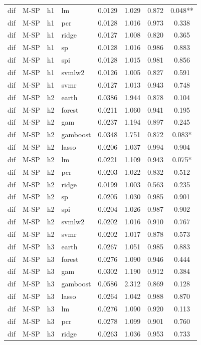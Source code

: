 \begin{ThreePartTable}
\begin{longtable}[t]{llclcccc}
dif & M-SP & h1 & lm & 0.0129 & 1.029 & 0.872 & 0.048**\\
dif & M-SP & h1 & pcr & 0.0128 & 1.016 & 0.973 & 0.338\\
dif & M-SP & h1 & ridge & 0.0127 & 1.008 & 0.820 & 0.365\\
dif & M-SP & h1 & sp & 0.0128 & 1.016 & 0.986 & 0.883\\
dif & M-SP & h1 & spi & 0.0128 & 1.015 & 0.981 & 0.856\\
dif & M-SP & h1 & svmlw2 & 0.0126 & 1.005 & 0.827 & 0.591\\
dif & M-SP & h1 & svmr & 0.0127 & 1.013 & 0.943 & 0.748\\
\addlinespace
dif & M-SP & h2 & earth & 0.0386 & 1.944 & 0.878 & 0.104\\
dif & M-SP & h2 & forest & 0.0211 & 1.060 & 0.941 & 0.195\\
dif & M-SP & h2 & gam & 0.0237 & 1.194 & 0.897 & 0.245\\
dif & M-SP & h2 & gamboost & 0.0348 & 1.751 & 0.872 & 0.083*\\
dif & M-SP & h2 & lasso & 0.0206 & 1.037 & 0.994 & 0.904\\
dif & M-SP & h2 & lm & 0.0221 & 1.109 & 0.943 & 0.075*\\
dif & M-SP & h2 & pcr & 0.0203 & 1.022 & 0.832 & 0.512\\
dif & M-SP & h2 & ridge & 0.0199 & 1.003 & 0.563 & 0.235\\
dif & M-SP & h2 & sp & 0.0205 & 1.030 & 0.985 & 0.901\\
dif & M-SP & h2 & spi & 0.0204 & 1.026 & 0.987 & 0.902\\
dif & M-SP & h2 & svmlw2 & 0.0202 & 1.016 & 0.910 & 0.767\\
dif & M-SP & h2 & svmr & 0.0202 & 1.017 & 0.878 & 0.573\\
\addlinespace
dif & M-SP & h3 & earth & 0.0267 & 1.051 & 0.985 & 0.883\\
dif & M-SP & h3 & forest & 0.0276 & 1.090 & 0.946 & 0.444\\
dif & M-SP & h3 & gam & 0.0302 & 1.190 & 0.912 & 0.384\\
dif & M-SP & h3 & gamboost & 0.0586 & 2.312 & 0.869 & 0.128\\
dif & M-SP & h3 & lasso & 0.0264 & 1.042 & 0.988 & 0.870\\
dif & M-SP & h3 & lm & 0.0276 & 1.090 & 0.920 & 0.113\\
dif & M-SP & h3 & pcr & 0.0278 & 1.099 & 0.901 & 0.760\\
dif & M-SP & h3 & ridge & 0.0263 & 1.036 & 0.953 & 0.733\\

\end{longtable}
\end{ThreePartTable}
